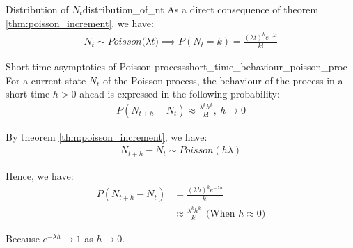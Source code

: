 \begin{corollary}{Distribution of $N_t$}{distribution_of_nt}
    As a direct consequence of theorem \ref{thm:poisson_increment}, we have:
    \begin{align*}
        N_t\sim Poisson\Big( \lambda t \Big) \implies P(N_t = k) = \frac{(\lambda t)^ke^{-\lambda t}}{k!}
    \end{align*}
\end{corollary}

\begin{corollary}{Short-time asymptotics of Poisson process}{short_time_behaviour_poisson_proc}
    For a current state $N_t$ of the Poisson process, the behaviour of the process in a short time $h>0$ ahead is expressed in the following probability:
    \begin{align*}
        P(N_{t+h} - N_t) \approx \frac{\lambda^kh^k}{k!}, \ h \to 0
    \end{align*}
\end{corollary}
\begin{proof*}
    By theorem \ref{thm:poisson_increment}, we have:
    \begin{align*}
        N_{t+h} - N_t \sim Poisson(h\lambda)
    \end{align*}

    \noindent Hence, we have:
    \begin{align*}
        P(N_{t+h} - N_t) &= \frac{(\lambda h)^k e^{-\lambda h}}{k!} \\
        &\approx \frac{\lambda^kh^k}{k!} \ \ \text{(When $h\approx 0$)}
    \end{align*}

    \noindent Because $e^{-\lambda h} \to 1$ as $h \to 0$.
\end{proof*}

